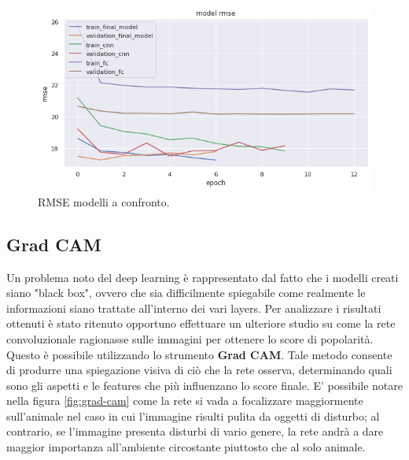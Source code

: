 \begin{figure}[h]
    \centering
    
    \includegraphics[scale=0.6]{Plot/ALL_RMSE.png}
    \caption{RMSE modelli a confronto.}
    \label{fig:rmse-all}
\end{figure}





\newpage


\subsection{Grad CAM}

Un problema noto del deep learning è rappresentato dal fatto che i modelli creati siano "black box", ovvero che sia difficilmente spiegabile come realmente le informazioni siano trattate all'interno dei vari layers. Per analizzare i risultati ottenuti è stato ritenuto opportuno effettuare un ulteriore studio su come la rete convoluzionale ragionasse sulle immagini per ottenere lo score di popolarità. Questo è possibile utilizzando lo strumento \textbf{Grad CAM}\cite{2019}. Tale metodo consente di produrre una spiegazione visiva di ciò che la rete osserva, determinando quali sono gli aspetti e le features che più influenzano lo score finale. E' possibile notare nella figura \ref{fig:grad-cam} come la rete si vada a focalizzare maggiormente sull'animale nel caso in cui l'immagine risulti pulita da oggetti di disturbo; al contrario, se l'immagine presenta disturbi di vario genere, la rete andrà a dare maggior importanza all'ambiente circostante piuttosto che al solo animale.

\vspace{1cm}

